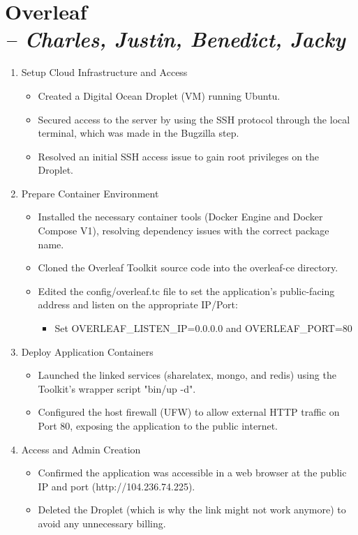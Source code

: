 \chapter[Overleaf]{Overleaf \\\small{\textit{-- Charles, Justin, Benedict, Jacky}}}
\label{Chapter::Overleaf}

\begin{enumerate}
    \item Setup Cloud Infrastructure and Access
    \begin{itemize}
        \item Created a Digital Ocean Droplet (VM) running  Ubuntu.
        \item Secured access to the server by using the SSH protocol through the local terminal, which was made in the Bugzilla step.
        \item Resolved an initial SSH access issue to gain root privileges on the Droplet.
    \end{itemize}

    \item Prepare Container Environment
    \begin{itemize}
        \item Installed the necessary container tools (Docker Engine and Docker Compose V1), resolving dependency issues with the correct package name.
        \item Cloned the Overleaf Toolkit source code into the overleaf-ce directory.
        \item Edited the config/overleaf.tc file to set the application's public-facing address and listen on the appropriate IP/Port:
        \begin{itemize}
            \item Set OVERLEAF\_LISTEN\_IP=0.0.0.0 and OVERLEAF\_PORT=80
        \end{itemize}
    \end{itemize}

    \item Deploy Application Containers
    \begin{itemize}
        \item Launched the linked services (sharelatex, mongo, and redis) using the Toolkit's wrapper script "bin/up -d".
        \item Configured the host firewall (UFW) to allow external HTTP traffic on Port 80, exposing the application to the public internet.
    \end{itemize}

    \item Access and Admin Creation
    \begin{itemize}
        \item Confirmed the application was accessible in a web browser at the public IP and port (http://104.236.74.225).
        \item Deleted the Droplet (which is why the link might not work anymore) to avoid any unnecessary billing.
    \end{itemize}
\end{enumerate}

